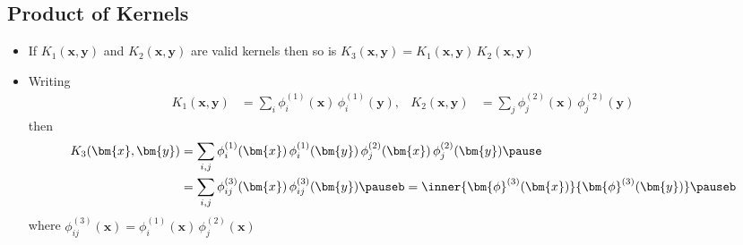 \begin{slide}
\section[-2]{Product of Kernels}

\begin{PauseHighLight}
  \begin{itemize}
  \item If $K_1(\bm{x}, \bm{y})$ and  $K_2(\bm{x}, \bm{y})$ are valid
    kernels then so is $K_3(\bm{x}, \bm{y}) = K_1(\bm{x}, \bm{y})\,
    K_2(\bm{x}, \bm{y})$\pause
  \item Writing {\small
    \begin{align*}
      K_1(\bm{x}, \bm{y}) &= \sum_i \phi^{(1)}_i(\bm{x})\,
    \phi^{(1)}_i(\bm{y}), &
                           K_2(\bm{x}, \bm{y}) &= \sum_j \phi^{(2)}_j(\bm{x})\,
    \phi^{(2)}_j(\bm{y})
    \end{align*}}
    then
    \begin{align*}
      K_3(\bm{x}, \bm{y})
      &= \sum_{i,j} \phi^{(1)}_i(\bm{x})\,\phi^{(1)}_i(\bm{y})\,
      \phi^{(2)}_j(\bm{x})\,\phi^{(2)}_j(\bm{y}) \pause\\
      &= \sum_{i,j} \phi^{(3)}_{ij}(\bm{x})\,
      \phi^{(3)}_{ij}(\bm{y})\pauseb = \inner{\bm{\phi}^{(3)}(\bm{x})}{\bm{\phi}^{(3)}(\bm{y})}\pauseb
    \end{align*}
    where $\phi^{(3)}_{ij}(\bm{x}) = \phi^{(1)}_i(\bm{x})\,\phi^{(2)}_j(\bm{x})$\pauseb
  \end{itemize}
\end{PauseHighLight}

\end{slide}


